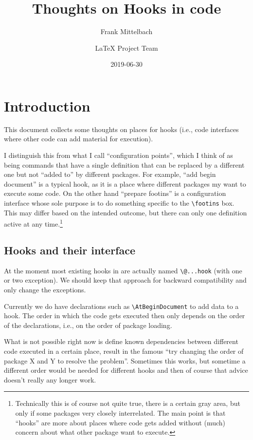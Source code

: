 \documentclass{article}
\title{Thoughts on Hooks in code}
\author{Frank Mittelbach \and
  \LaTeX{} Project Team}
\date{2019-06-30}
\newcounter{hook}
\newcounter{config}
\newcommand\cs[1]{\texttt{\textbackslash #1}}
\begin{document}
\maketitle

\tableofcontents

\section{Introduction}


This document collects some thoughts on places for hooks (i.e., code
interfaces where other code can add material for execution).

I distinguish this from what I call  ``configuration points'', which I think of as
being commands that have a single definition that can be replaced by a
different one but not ``added to'' by different packages. For example,
``add begin document'' is a typical hook, as it is a place where
different packages my want to execute some code. On the other hand
``prepare footins'' is a configuration interface whose sole purpose is
to do something specific to the \cs{footins} box. This may differ
based on the intended outcome, but there can only one definition active at any
time.\footnote{Technically this is of course not quite true, there is
  a certain gray area, but only if some packages very closely
  interrelated. The main point is that ``hooks'' are more about places
  where code gets added without (much) concern about what other
  package want to execute.}


\subsection{Hooks and their interface}

At the moment most existing hooks in \LaTeXe{} are actually named
\cs{@...hook} (with one or two exception). We should keep that
approach for backward compatibility and only change the exceptions.

Currently we do have declarations such as \cs{AtBeginDocument} to add
data to a hook.  The order in which the code gets executed then only
depends on the order of the declarations, i.e., on the order of
package loading.

What is not possible right now is define known dependencies between
different code executed in a certain place, result in the famous ``try
changing the order of package X and Y to resolve the
problem''. Sometimes this works, but sometime a different order would
be needed for different hooks and then of course that advice doesn't
really any longer work.
\end{document}
